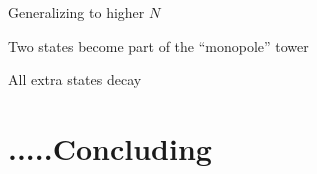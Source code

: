 \documentclass{beamer}
\begin{document}
\begin{frame}{Generalizing to higher $ N $}

\begin{block}{}

	\vspace{2mm}
	Two states become part of the ``monopole'' tower
	\vspace{2mm}

\end{block}

\vspace{7mm}

\pause
\begin{block}{}

	\vspace{2mm}
	All extra states decay

	\vspace{1mm}
	\vspace{2mm}

\end{block}

\vspace{7mm}


\end{frame}



\section{.....Concluding}
\end{document}
